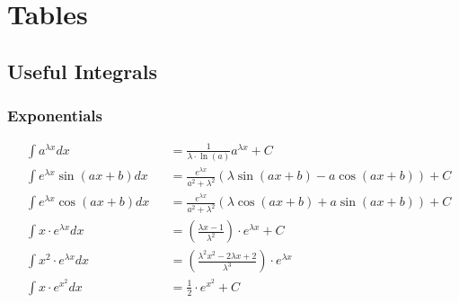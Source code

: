 \section{Tables}
\subsection{Useful Integrals}
\subsubsection{Exponentials}
\begin{footnotesize}
    \noindent\begin{align*}
         & \int a^{\lambda x}dx           &  & =\frac{1}{\lambda \cdot \ln(a)}a^{\lambda x}+C                                     \\
         & \int e^{\lambda x}\sin(ax+b)dx &  & =\frac{e^{\lambda x}}{a^2+\lambda ^2}\left(\lambda \sin(ax+b)-a\cos(ax+b)\right)+C \\
         & \int e^{\lambda x}\cos(ax+b)dx &  & =\frac{e^{\lambda x}}{a^2+\lambda ^2}\left(\lambda \cos(ax+b)+a\sin(ax+b)\right)+C \\
         & \int x \cdot e^{\lambda x}dx   &  & =(\frac{\lambda x-1}{\lambda ^2})\cdot e^{\lambda x}+C                             \\
         & \int x^2 \cdot e^{\lambda x}dx &  & =(\frac{\lambda ^2x^2-2\lambda x+2}{\lambda ^3})\cdot e^{\lambda x}                \\
         & \int x\cdot e^{x^2}dx          &  & =\frac{1}{2}\cdot e^{x^2}+C
    \end{align*}
\end{footnotesize}

